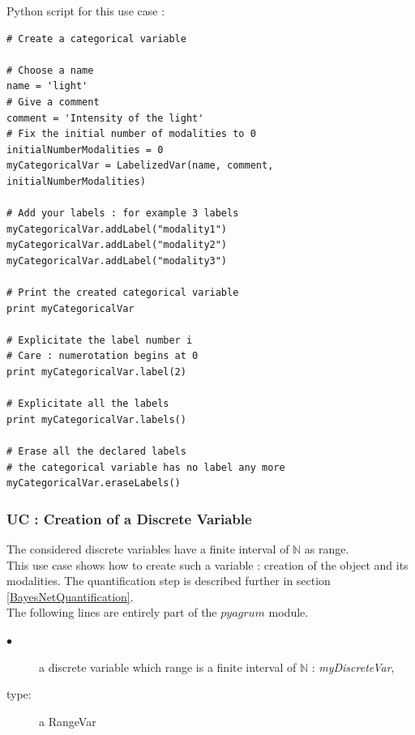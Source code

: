 \espace
Python  script for this use case :

\begin{lstlisting}
# Create a categorical variable

# Choose a name
name = 'light'
# Give a comment
comment = 'Intensity of the light'
# Fix the initial number of modalities to 0
initialNumberModalities = 0
myCategoricalVar = LabelizedVar(name, comment, initialNumberModalities)

# Add your labels : for example 3 labels
myCategoricalVar.addLabel("modality1")
myCategoricalVar.addLabel("modality2")
myCategoricalVar.addLabel("modality3")

# Print the created categorical variable
print myCategoricalVar

# Explicitate the label number i
# Care : numerotation begins at 0
print myCategoricalVar.label(2)

# Explicitate all the labels
print myCategoricalVar.labels()

# Erase all the declared labels 
# the categorical variable has no label any more
myCategoricalVar.eraseLabels()
\end{lstlisting}



\newpage \subsubsection{UC : Creation of a Discrete Variable }

The considered discrete variables have a finite interval of $\mathbb{N}$ as range. \\

This use case shows how to create such a variable : creation of the object and its modalities. The quantification step is described further in section \ref{BayesNetQuantification}.\\

The following lines are entirely part of the $pyagrum$ module.\\ 

{
  \begin{description}
  \item[$\bullet$] a discrete variable  which range is a finite interval of $\mathbb{N}$ : {\itshape myDiscreteVar},
  \item[type:] a RangeVar
  \end{description}
}

